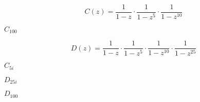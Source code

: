 \documentclass[10pt]{book}
\begin{document}
\begin{mdSnippets}
\begin{mdDisplaySnippet}[73331dc460c1dec712ff7909d2560d75]%
\[%
  C(z) = \frac{1}{1-z}\cdot\frac{1}{1-z^5}\cdot\frac{1}{1-z^{10}}
\]%
\end{mdDisplaySnippet}%
\begin{mdInlineSnippet}[516b2ff426eec68f97c958e36176bc23]%
$C_{100}$\end{mdInlineSnippet}%
\begin{mdDisplaySnippet}[4e3ae1a03cad068df040712311c29259]%
\[%
   D(z) = \frac{1}{1-z}\cdot\frac{1}{1-z^5}\cdot\frac{1}{1-z^{10}}
   \cdot\frac{1}{1-z^{25}}
\]%
\end{mdDisplaySnippet}%
\begin{mdInlineSnippet}[842f823f9d3b002de70da22fbd20df3e]%
$C_{5i}$\end{mdInlineSnippet}%
\begin{mdInlineSnippet}[cd015e20f2c67b077ccecd03f14f972a]%
$D_{25i}$\end{mdInlineSnippet}%
\begin{mdInlineSnippet}[403dc861513703bb6c02401d882ff668]%
$D_{100}$\end{mdInlineSnippet}%

\end{mdSnippets}
\end{document}
